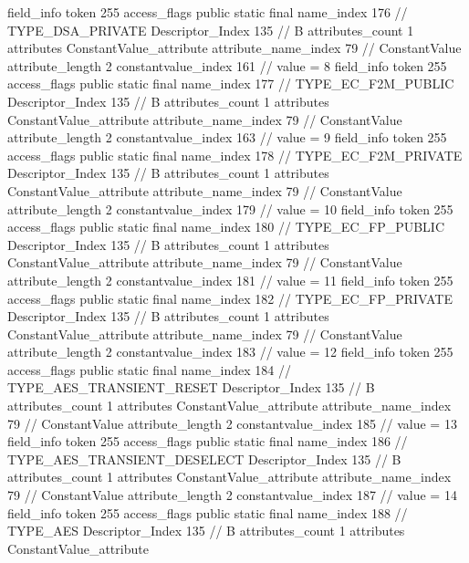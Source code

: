 {{{{{{{				}
				}
			}
			field_info {
				token	255
				access_flags	public static final
				name_index	176		// TYPE_DSA_PRIVATE
				Descriptor_Index	135		// B
				attributes_count	1
				attributes {
				ConstantValue_attribute {
					attribute_name_index	79		// ConstantValue
					attribute_length	2
					constantvalue_index	161		// value = 8
				}
				}
			}
			field_info {
				token	255
				access_flags	public static final
				name_index	177		// TYPE_EC_F2M_PUBLIC
				Descriptor_Index	135		// B
				attributes_count	1
				attributes {
				ConstantValue_attribute {
					attribute_name_index	79		// ConstantValue
					attribute_length	2
					constantvalue_index	163		// value = 9
				}
				}
			}
			field_info {
				token	255
				access_flags	public static final
				name_index	178		// TYPE_EC_F2M_PRIVATE
				Descriptor_Index	135		// B
				attributes_count	1
				attributes {
				ConstantValue_attribute {
					attribute_name_index	79		// ConstantValue
					attribute_length	2
					constantvalue_index	179		// value = 10
				}
				}
			}
			field_info {
				token	255
				access_flags	public static final
				name_index	180		// TYPE_EC_FP_PUBLIC
				Descriptor_Index	135		// B
				attributes_count	1
				attributes {
				ConstantValue_attribute {
					attribute_name_index	79		// ConstantValue
					attribute_length	2
					constantvalue_index	181		// value = 11
				}
				}
			}
			field_info {
				token	255
				access_flags	public static final
				name_index	182		// TYPE_EC_FP_PRIVATE
				Descriptor_Index	135		// B
				attributes_count	1
				attributes {
				ConstantValue_attribute {
					attribute_name_index	79		// ConstantValue
					attribute_length	2
					constantvalue_index	183		// value = 12
				}
				}
			}
			field_info {
				token	255
				access_flags	public static final
				name_index	184		// TYPE_AES_TRANSIENT_RESET
				Descriptor_Index	135		// B
				attributes_count	1
				attributes {
				ConstantValue_attribute {
					attribute_name_index	79		// ConstantValue
					attribute_length	2
					constantvalue_index	185		// value = 13
				}
				}
			}
			field_info {
				token	255
				access_flags	public static final
				name_index	186		// TYPE_AES_TRANSIENT_DESELECT
				Descriptor_Index	135		// B
				attributes_count	1
				attributes {
				ConstantValue_attribute {
					attribute_name_index	79		// ConstantValue
					attribute_length	2
					constantvalue_index	187		// value = 14
				}
				}
			}
			field_info {
				token	255
				access_flags	public static final
				name_index	188		// TYPE_AES
				Descriptor_Index	135		// B
				attributes_count	1
				attributes {
				ConstantValue_attribute {
}}}}}}}
